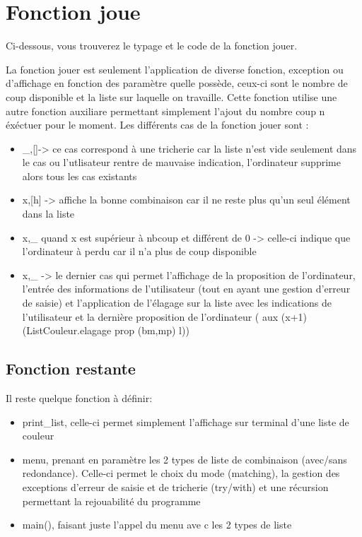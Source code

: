 \documentclass[a4paper,twoside,12pt]{report}
\newcommand{\moncode}[1]{\begin{center}
                        
                        \end{center}}
\begin{document}
\section{Fonction joue}
%
Ci-dessous, vous trouverez le typage et le code de la fonction jouer.
\moncode{mastermind.mli}
%
\moncode{jouer.ml}
%
La fonction jouer est seulement l'application de diverse fonction, exception ou d'affichage en fonction des paramètre quelle possède, ceux-ci sont  le nombre de coup disponible et la liste sur laquelle on travaille. Cette fonction utilise une autre fonction auxiliare permettant simplement l'ajout du nombre coup n éxéctuer pour le moment. Les différents cas de la fonction jouer sont :
\begin{itemize}
\item \_,[]-> ce cas correspond à une tricherie car la liste n'est vide seulement dans le cas ou l'utlisateur rentre de mauvaise indication, l'ordinateur supprime alors tous les cas existants
\item x,[h] -> affiche la bonne combinaison car il ne reste plus qu'un seul élément dans la liste
\item x,\_ quand x est supérieur à nbcoup et différent de 0 -> celle-ci indique que l'ordinateur à perdu car il n'a plus de coup disponible
\item x,\_ -> le dernier cas qui permet l'affichage de la proposition de l'ordinateur, l'entrée des informations de l'utilisateur (tout en ayant une gestion d'erreur de saisie) et l'application de l'élagage sur la liste avec les indications de l'utilisateur et la dernière proposition de l'ordinateur ( aux (x+1) (ListCouleur.elagage prop (bm,mp) l))
\end{itemize}
\subsection{Fonction restante}
Il reste quelque fonction à définir:
\begin{itemize}	
\item print\_list, celle-ci permet simplement l'affichage sur terminal d'une liste de couleur
\item menu, prenant en paramètre les 2 types de liste de combinaison (avec/sans redondance). Celle-ci permet le choix du mode (matching), la gestion des exceptions d'erreur de saisie et de tricherie (try/with) et une récursion permettant la rejouabilité du programme
\item main(), faisant juste l'appel du menu ave c les 2 types de liste 
\end{itemize}
\end{document}
